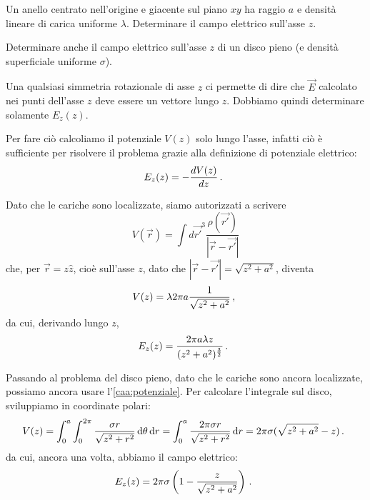 \documentclass[../main.tex]{subfiles}
\begin{document}

\textex
Un anello centrato nell'origine e giacente sul piano $xy$ ha raggio $a$ e densità lineare di carica uniforme $\lambda$. Determinare il campo elettrico sull'asse $z$.

Determinare anche il campo elettrico sull'asse $z$ di un disco pieno (e densità superficiale uniforme $\sigma$).

\solution

Una qualsiasi simmetria rotazionale di asse $z$ ci permette di dire che $\vec{E}$ calcolato nei punti dell'asse $z$ deve essere un vettore lungo $z$.
Dobbiamo quindi determinare solamente $E_z(z)$.

Per fare ciò calcoliamo il potenziale $V(z)$ solo lungo l'asse, infatti ciò è sufficiente per risolvere il problema grazie alla definizione di potenziale elettrico:
\[
	E_z(z)=-\frac{dV(z)}{dz}\, \text{. }
\]

Dato che le cariche sono localizzate, siamo autorizzati a scrivere
\begin{equation}\label{caa:potenziale}
	V(\vec{r})=\int d\vec{r'}^3 \frac{\rho(\vec{r'})}{|\vec{r}-\vec{r'}|}
\end{equation}
che, per $\vec{r}=z\hat{z}$, cioè sull'asse $z$, dato che $|\vec{r}-\vec{r'}|=\sqrt{z^2+a^2}$, diventa
\[
	V(z)=\lambda 2\pi a \frac{1}{\sqrt{z^2+a^2}}\, \text{, }
\]
da cui, derivando lungo $z$,
\[
	E_z(z)=\frac{2\pi a\lambda z}{(z^2+a^2)^{\frac{3}{2}}}\, \text{. }
\]

Passando al problema del disco pieno, dato che le cariche sono ancora localizzate, possiamo ancora usare l'\cref{caa:potenziale}. Per calcolare l'integrale sul disco, sviluppiamo in coordinate polari:
\[
	V(z)=\int_0^a \int_0^{2\pi} \frac{\sigma r}{\sqrt{z^2+r^2}}\,\mathrm d \theta \,\mathrm d r = \int_0^a \frac{2\pi\sigma r}{\sqrt{z^2+r^2}}\,\mathrm d r = 2\pi\sigma (\sqrt{z^2+a^2}-z)\, \text{. }
\]
da cui, ancora una volta, abbiamo il campo elettrico:
\[
	E_z(z)=2\pi\sigma \left(1-\frac{z}{\sqrt{z^2+a^2}}\right)\, \text{. }
\]
\end{document}
